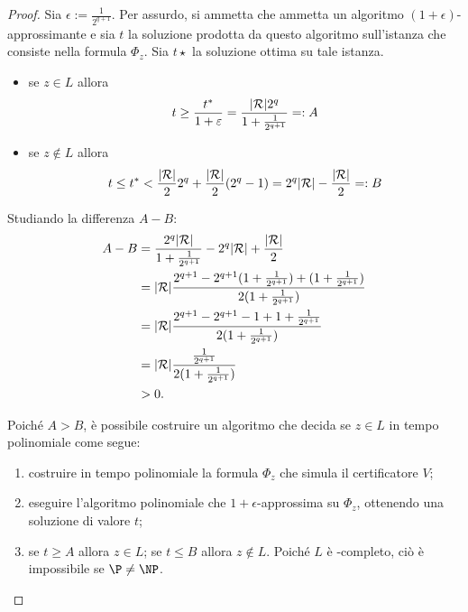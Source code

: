 \begin{proof}
	Sia $\epsilon:=\frac{1}{2^{q+1}}$.
	Per assurdo, si ammetta che \MaxSat ammetta un algoritmo $(1+\epsilon)$-approssimante e sia $t$ la soluzione prodotta da questo algoritmo sull'istanza che consiste nella formula $\Phi_z$.
	Sia $t\star$ la soluzione ottima su tale istanza.
	\begin{itemize}
		\item se $z\in L$ allora
		      \begin{equation*}
			      t \geq \frac{t^*}{1+\varepsilon} = \frac{| \mathcal R | 2^q}{1+\frac{1}{2^{q+1}}} =: A
		      \end{equation*}
		\item se $z\notin L$ allora
		      \begin{equation*}
			      t \leq t^* < \frac{| \mathcal R |}{2}2^q+\frac{| \mathcal R |}{2}(2^q-1) = 2^q| \mathcal R |-\frac{| \mathcal R |}{2} =: B
		      \end{equation*}
	\end{itemize}
	Studiando la differenza $A-B$:
	\begin{align*}
		A-B & = \frac{2^q| \mathcal R |}{1+\frac{1}{2^{q+1}}} - 2^q| \mathcal R |+\frac{| \mathcal R |}{2}                           \\
		    & = | \mathcal R | \frac{2^{q+1} - 2^{q+1}(1+\frac{1}{2^{q+1}}) + (1+\frac{1}{2^{q+1}})}{2(1+\frac{1}{2^{q+1}})} \\
		    & = | \mathcal R | \frac{2^{q+1} - 2^{q+1}-1 + 1+\frac{1}{2^{q+1}}}{2(1+\frac{1}{2^{q+1}})}                      \\
		    & = | \mathcal R | \frac{\frac{1}{2^{q+1}}}{2(1 + \frac{1}{2^{q+1}})}                                            \\
		    & > 0 \text.
	\end{align*}

	Poiché $A>B$, è possibile costruire un algoritmo che decida se $z\in L$ in tempo polinomiale come segue:
	\begin{enumerate}
		\item costruire in tempo polinomiale la formula $\Phi_z$ che simula il certificatore $V$;
		\item eseguire l'algoritmo polinomiale che $1+\epsilon$-approssima \MaxSat su $\Phi_z$, ottenendo una soluzione di valore $t$;
		\item se $t\geq A$ allora $z\in L$; se $t\leq B$ allora $z\notin L$.
		      Poiché $L$ è \NP-completo, ciò è impossibile se $\P\neq\NP$.
	\end{enumerate}
\end{proof}


